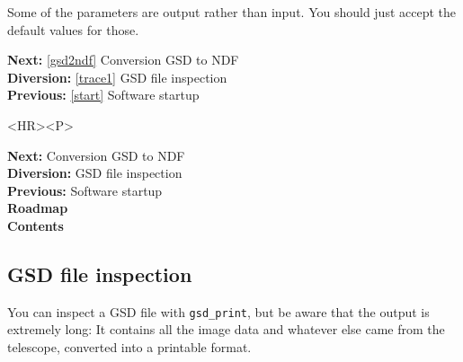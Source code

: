 \documentclass[11pt]{article}
\newenvironment{latexonly}{}{}
\newcommand{\htmlref}[2]{#1}
\newcommand{\xref}[3]{#1}
\newcommand{\xlabel}[1]{}
\begin{document}
   Some of the parameters are output rather than input. You should just accept
   the default values for those.

\begin{latexonly}
{\bf Next:} \ref{gsd2ndf} Conversion GSD to NDF\\
{\bf Diversion:} \ref{trace1} GSD file inspection\\
{\bf Previous:} \ref{start} Software startup\\
\end{latexonly}

\begin{htmlonly}
\begin{rawhtml} <HR><P> \end{rawhtml}
{\bf \htmlref{Next:}{gsd2ndf}} Conversion GSD to NDF\\
{\bf \htmlref{Diversion:}{trace1}} GSD file inspection\\
{\bf \htmlref{Previous:}{start}} Software startup\\
{\bf \htmlref{Roadmap}{roadmap}}\\
{\bf \htmlref{Contents}{stardoccontents}}\\
\end{htmlonly}


\subsection{\label{trace1}\xlabel{trace1}GSD file inspection}

   You can inspect a GSD file with
{\tt \xref{gsd\_print}{sun132}{GSD_PRINT}},
   but be aware that the output is extremely long: It contains all the
   image data and whatever else came from the telescope, converted into
   a printable format.
\end{document}
